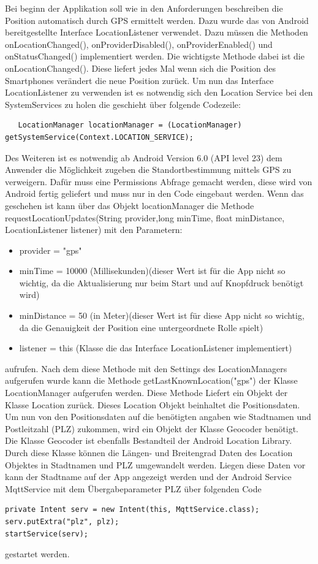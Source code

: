 Bei beginn der Applikation soll wie in den Anforderungen beschreiben die Position automatisch durch GPS ermittelt werden. Dazu wurde das von Android bereitgestellte Interface LocationListener verwendet. Dazu müssen die Methoden onLocationChanged(), onProviderDisabled(), onProviderEnabled() und onStatusChanged() implementiert werden. 
Die wichtigste Methode dabei ist die onLocationChanged(). Diese liefert jedes Mal wenn sich die Position des Smartphones verändert die neue Position zurück. 
Um nun das Interface LocationListener zu verwenden ist es notwendig sich den Location Service bei den SystemServices zu holen die geschieht über folgende Codezeile:
  \begin{lstlisting}
   LocationManager locationManager = (LocationManager) getSystemService(Context.LOCATION_SERVICE);
  \end{lstlisting}
  Des Weiteren ist es notwendig ab Android Version 6.0 (API level 23) dem Anwender die Möglichkeit zugeben die Standortbestimmung mittels GPS zu verweigern. Dafür muss eine Permissions Abfrage gemacht werden, diese wird von Android fertig geliefert und muss nur in den Code eingebaut werden. Wenn das geschehen ist kann über das Objekt locationManager die Methode requestLocationUpdates(String provider,long minTime, float minDistance, LocationListener listener) mit den Parametern: 
    \begin{itemize}
\item provider = "gps"
\item minTime = 10000 (Millisekunden)(dieser Wert ist für die App nicht so wichtig, da die Aktualisierung nur beim Start und auf Knopfdruck benötigt wird)
\item minDistance = 50 (in Meter)(dieser Wert ist für diese App nicht so wichtig, da die Genauigkeit der Position eine untergeordnete Rolle spielt)
\item listener = this (Klasse die das Interface LocationListener implementiert)
\end{itemize}  
aufrufen. Nach dem diese Methode mit den Settings des LocationManagers aufgerufen wurde kann die Methode getLastKnownLocation("gps") der Klasse LocationManager aufgerufen werden. Diese Methode Liefert ein Objekt der Klasse Location zurück. Dieses Location Objekt beinhaltet die Positionsdaten. Um nun von den Positionsdaten auf die benötigten angaben wie Stadtnamen und Postleitzahl (PLZ) zukommen, wird ein Objekt der Klasse Geocoder benötigt. Die Klasse Geocoder ist ebenfalls Bestandteil der Android Location Library. Durch diese Klasse können die Längen- und Breitengrad Daten des Location Objektes in Stadtnamen und PLZ umgewandelt werden.
Liegen diese Daten vor kann der Stadtname auf der App angezeigt werden und der Android Service MqttService mit dem Übergabeparameter PLZ über folgenden Code 
 \begin{lstlisting}
private Intent serv = new Intent(this, MqttService.class);
serv.putExtra("plz", plz); 
startService(serv);
  \end{lstlisting}
gestartet werden.
